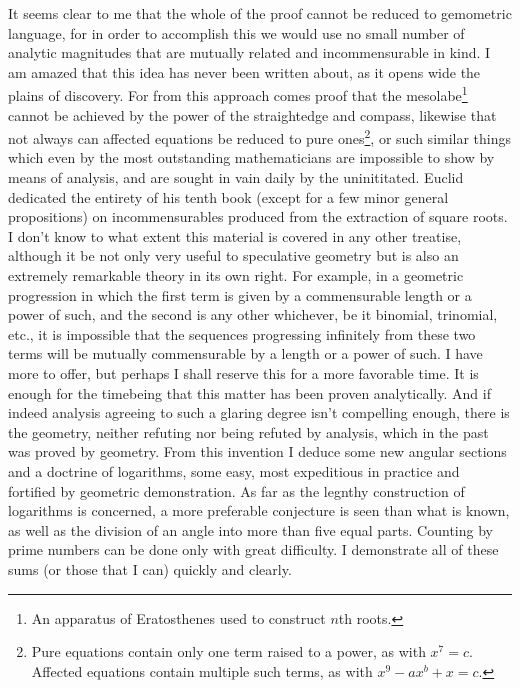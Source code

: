 \documentclass[11pt,letterpaper]{book}
\begin{document}
It seems clear to me that the whole of the proof cannot be reduced to
gemometric language, for in order to accomplish this we would use no small
number of analytic magnitudes that are mutually related and
incommensurable in kind.  I am amazed that this idea has never been written
about, as it opens wide the plains of discovery.
For from this approach comes proof that the mesolabe\footnote{An
apparatus of Eratosthenes used to construct $n$th roots.} cannot be achieved by
the power of the straightedge and compass, likewise that not always can
affected equations be reduced to pure ones\footnote{Pure equations contain
only one term raised to a power, as with $x^7 = c$.  Affected equations contain
multiple such terms, as with $x^9-ax^b+x = c$.}, 
or such similar
things which even by the most outstanding mathematicians are impossible to show
by means of analysis, and are sought in vain daily by the uninititated.
Euclid dedicated the entirety of his tenth book (except for a few minor general
propositions) on incommensurables produced from the extraction of square roots.
I don't know to what extent this material is covered in any other treatise,
although it be not only very useful to speculative geometry but is also an
extremely remarkable theory in its own right.
For example, in a geometric progression in which the first term is given by a
commensurable length or a power of such, and the second is any
other whichever, be it binomial, trinomial, etc., it is impossible that the
sequences progressing infinitely from these two terms will be mutually
commensurable by a length or a power of such.
I have more to offer, but perhaps I shall reserve this for a more favorable
time.
It is enough for the timebeing that this matter has been proven analytically.
And if indeed analysis agreeing to such a glaring degree isn't compelling
enough, there is the geometry, neither refuting nor being refuted by
analysis, which in the past was proved by geometry.
From this invention I deduce some new angular sections and a doctrine of
logarithms, some easy, most expeditious in practice and fortified by geometric
demonstration.
As far as the legnthy construction of logarithms is concerned, a more preferable
conjecture is seen than what is known, as well as the division of an angle into
more than five equal parts.
Counting by prime numbers can be done only with great difficulty.
I demonstrate all of these sums (or those that I can) quickly and clearly.
\end{document}
